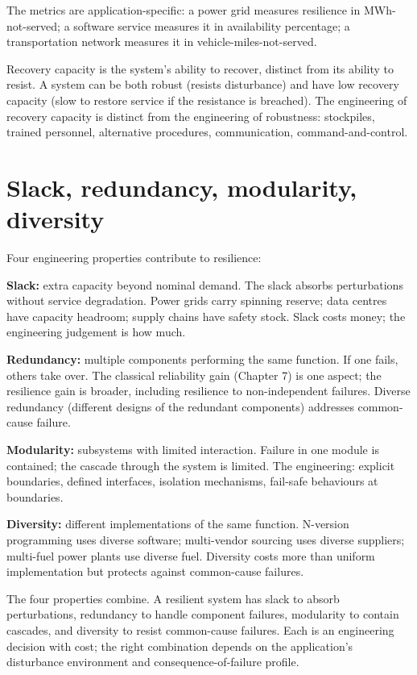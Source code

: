 The metrics are application-specific: a power grid measures resilience in MWh-not-served; a software service measures it in availability percentage; a transportation network measures it in vehicle-miles-not-served.

Recovery capacity is the system's ability to recover, distinct from its ability to resist. A system can be both robust (resists disturbance) and have low recovery capacity (slow to restore service if the resistance is breached). The engineering of recovery capacity is distinct from the engineering of robustness: stockpiles, trained personnel, alternative procedures, communication, command-and-control.

\section{Slack, redundancy, modularity, diversity}

Four engineering properties contribute to resilience:

\textbf{Slack:} extra capacity beyond nominal demand. The slack absorbs perturbations without service degradation. Power grids carry spinning reserve; data centres have capacity headroom; supply chains have safety stock. Slack costs money; the engineering judgement is how much.

\textbf{Redundancy:} multiple components performing the same function. If one fails, others take over. The classical reliability gain (Chapter 7) is one aspect; the resilience gain is broader, including resilience to non-independent failures. Diverse redundancy (different designs of the redundant components) addresses common-cause failure.

\textbf{Modularity:} subsystems with limited interaction. Failure in one module is contained; the cascade through the system is limited. The engineering: explicit boundaries, defined interfaces, isolation mechanisms, fail-safe behaviours at boundaries.

\textbf{Diversity:} different implementations of the same function. N-version programming uses diverse software; multi-vendor sourcing uses diverse suppliers; multi-fuel power plants use diverse fuel. Diversity costs more than uniform implementation but protects against common-cause failures.

The four properties combine. A resilient system has slack to absorb perturbations, redundancy to handle component failures, modularity to contain cascades, and diversity to resist common-cause failures. Each is an engineering decision with cost; the right combination depends on the application's disturbance environment and consequence-of-failure profile.

